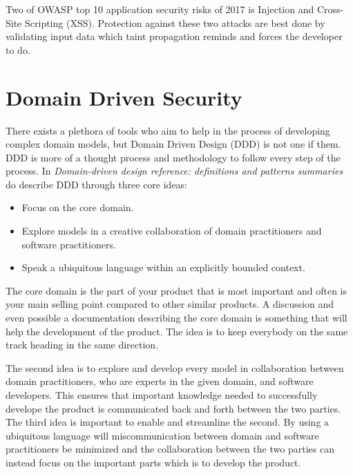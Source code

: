 Two of OWASP top 10 application security risks of 2017 is Injection and Cross-Site Scripting (XSS). \parencite{OWASP2017} Protection against these two attacks are best done by validating input data which taint propagation reminds and forces the developer to do.


\section{Domain Driven Security}
There exists a plethora of tools who aim to help in the process of developing complex domain models, but Domain Driven Design (DDD) is not one if them. \parencite{Bankes, 10.1007/978-3-319-24309-2_33} DDD is more of a thought process and methodology to follow every step of the process. \parencite{EvansEric2004Dd:t} In \emph{Domain-driven design reference: definitions and patterns summaries} do \textcite{evans_2015} describe DDD through three core ideas:

\begin{itemize}
  \item Focus on the core domain.
  \item Explore models in a creative collaboration of domain practitioners and software practitioners.
  \item Speak a ubiquitous language within an explicitly bounded context.
\end{itemize}

The core domain is the part of your product that is most important and often is your main selling point compared to other similar products. \parencite{millett_2015} A discussion and even possible a documentation describing the core domain is something that will help the development of the product. The idea is to keep everybody on the same track heading in the same direction. \parencite{EvansEric2004Dd:t}

The second idea is to explore and develop every model in collaboration between domain practitioners, who are experts in the given domain, and software developers. This ensures that important knowledge needed to successfully develope the product is communicated back and forth between the two parties. \parencite{millett_2015} The third idea is important to enable and streamline the second. By using a ubiquitous language will miscommunication between domain and software practitioners be minimized and the collaboration between the two parties can instead focus on the important parts which is to develop the product. \parencite{evans_2015}

